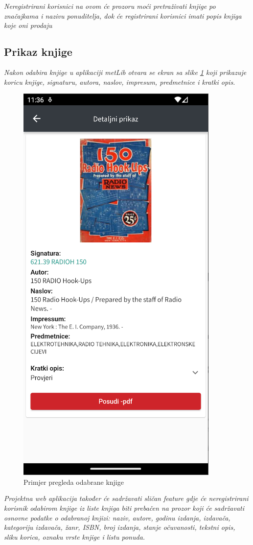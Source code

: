 	\textit{Neregistrirani korisnici na ovom će prozoru moći pretraživati knjige po značajkama i nazivu ponuditelja, dok će registrirani korisnici imati popis knjiga koje oni prodaju}
	
	\subsection{Prikaz knjige}
	
	\textit{Nakon odabira knjige u aplikaciji metLib otvara se ekran sa slike \ref{fig:prozor knjige} koji prikazuje koricu knjige, signaturu, autora, naslov, impresum, predmetnice i kratki opis.} 
	
	\begin{figure}[H]
		\includegraphics[scale=0.4]{slike/BookScreen.PNG} %
		\centering
		\caption{Primjer pregleda odabrane knjige}
		\label{fig:prozor knjige}
	\end{figure}
		
	\textit{Projektna web aplikacija također će sadržavati sličan feature gdje će neregistrirani korisnik odabirom knjige iz liste knjiga biti prebačen na prozor koji će sadržavati osnovne podatke o odabranoj knjizi: naziv, autore, godinu izdanja, izdavača, kategoriju izdavača, žanr, ISBN, broj izdanja, stanje očuvanosti, tekstni opis, sliku korica, oznaku vrste knjige i listu ponuda.}
	
		
	